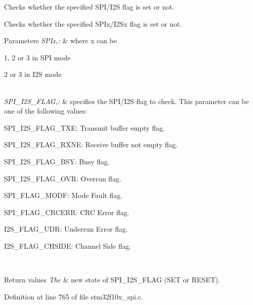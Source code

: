 Checks whether the specified S\-P\-I/\-I2\-S flag is set or not. 

Checks whether the specified S\-P\-Ix/\-I2\-Sx flag is set or not.


\begin{DoxyParams}{Parameters}
{\em S\-P\-Ix,\-:} & where x can be
\begin{DoxyItemize}
\item 1, 2 or 3 in S\-P\-I mode
\item 2 or 3 in I2\-S mode 
\end{DoxyItemize}\\
\hline
{\em S\-P\-I\-\_\-\-I2\-S\-\_\-\-F\-L\-A\-G,\-:} & specifies the S\-P\-I/\-I2\-S flag to check. This parameter can be one of the following values\-: \begin{DoxyItemize}
\item S\-P\-I\-\_\-\-I2\-S\-\_\-\-F\-L\-A\-G\-\_\-\-T\-X\-E\-: Transmit buffer empty flag. \item S\-P\-I\-\_\-\-I2\-S\-\_\-\-F\-L\-A\-G\-\_\-\-R\-X\-N\-E\-: Receive buffer not empty flag. \item S\-P\-I\-\_\-\-I2\-S\-\_\-\-F\-L\-A\-G\-\_\-\-B\-S\-Y\-: Busy flag. \item S\-P\-I\-\_\-\-I2\-S\-\_\-\-F\-L\-A\-G\-\_\-\-O\-V\-R\-: Overrun flag. \item S\-P\-I\-\_\-\-F\-L\-A\-G\-\_\-\-M\-O\-D\-F\-: Mode Fault flag. \item S\-P\-I\-\_\-\-F\-L\-A\-G\-\_\-\-C\-R\-C\-E\-R\-R\-: C\-R\-C Error flag. \item I2\-S\-\_\-\-F\-L\-A\-G\-\_\-\-U\-D\-R\-: Underrun Error flag. \item I2\-S\-\_\-\-F\-L\-A\-G\-\_\-\-C\-H\-S\-I\-D\-E\-: Channel Side flag. \end{DoxyItemize}
\\
\hline
\end{DoxyParams}

\begin{DoxyRetVals}{Return values}
{\em The} & new state of S\-P\-I\-\_\-\-I2\-S\-\_\-\-F\-L\-A\-G (S\-E\-T or R\-E\-S\-E\-T). \\
\hline
\end{DoxyRetVals}


Definition at line 765 of file stm32f10x\-\_\-spi.\-c.

